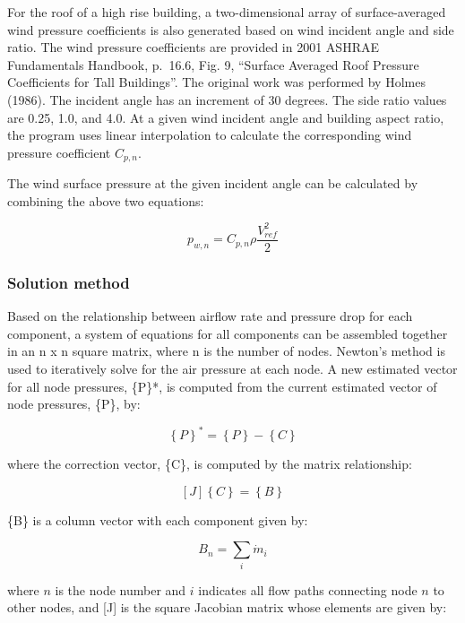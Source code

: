 For the roof of a high rise building, a two-dimensional array of surface-averaged wind pressure coefficients is also generated based on wind incident angle and side ratio. The wind pressure coefficients are provided in 2001 ASHRAE Fundamentals Handbook, p.~16.6, Fig. 9, ``Surface Averaged Roof Pressure Coefficients for Tall Buildings''. The original work was performed by Holmes (1986). The incident angle has an increment of 30 degrees. The side ratio values are 0.25, 1.0, and 4.0. At a given wind incident angle and building aspect ratio, the program uses linear interpolation to calculate the corresponding wind pressure coefficient $C_{p,n}$.

The wind surface pressure at the given incident angle can be calculated by combining the above two equations:

\begin{equation}
p_{w,n} = C_{p,n}\rho \frac{V_{ref}^2}{2}
\end{equation}

\subsubsection{Solution method}\label{solution-method}

Based on the relationship between airflow rate and pressure drop for each component, a system of equations for all components can be assembled together in an n x n square matrix, where n is the number of nodes. Newton's method is used to iteratively solve for the air pressure at each node. A new estimated vector for all node pressures, \{P\}*, is computed from the current estimated vector of node pressures, \{P\}, by:

\begin{equation}
{\left\{ P \right\}^*} = \left\{ P \right\} - \left\{ C \right\}
\end{equation}

where the correction vector, \{C\}, is computed by the matrix relationship:

\begin{equation}
\left[ J \right]\left\{ C \right\} = \left\{ B \right\}
\end{equation}

\{B\} is a column vector with each component given by:

\begin{equation}
B_n = \sum_{i} \dot{m}_i
\end{equation}

where $n$ is the node number and $i$ indicates all flow paths connecting node $n$ to other nodes, and [J] is the square Jacobian matrix whose elements are given by:

